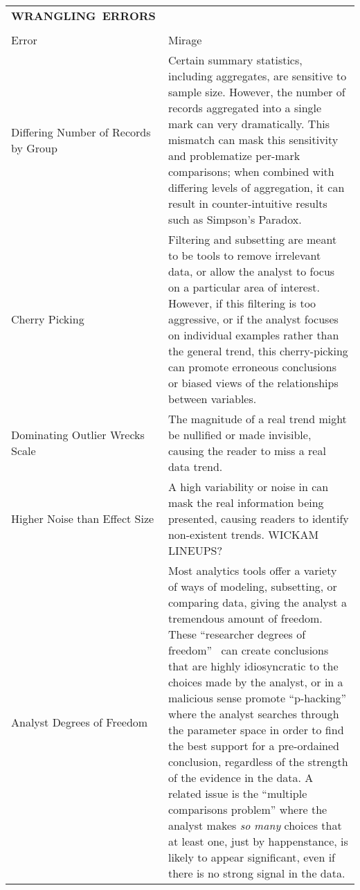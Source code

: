 \begin{longtable}{p{3cm}p{14cm}}
  \\\hbox{\normalsize{\textbf{WRANGLING ERRORS}}}&\\ \\
  \normalsize{Error} & \normalsize{Mirage}\\ \hline
   \rowcolor{colorb}Differing Number \newline of Records by \newline Group  & Certain summary statistics, including aggregates, are sensitive to sample size. However, the number of records aggregated into a single mark can very dramatically. This mismatch can mask this sensitivity and problematize per-mark comparisons; when combined with differing levels of aggregation, it can result in counter-intuitive results such as Simpson's Paradox. \cite{guo2017you}\\
 \rowcolor{colorb-opaque}Cherry Picking & Filtering and subsetting are meant to be tools to remove irrelevant data, or allow the analyst to focus on a particular area of interest. However, if this filtering is too aggressive, or if the analyst focuses on individual examples rather than the general trend, this cherry-picking can promote erroneous conclusions or biased views of the relationships between variables. \cite{few2019loom}\\
 \rowcolor{colorb}Dominating Outlier Wrecks Scale & The magnitude of a real trend might be nullified or made invisible, causing the reader to miss a real data trend.  \cite{kindlmann2014algebraic}\\
 \rowcolor{colorb-opaque}Higher Noise than Effect Size & A high variability or noise in can mask the real information being presented, causing readers to identify non-existent trends. WICKAM LINEUPS?\\
 \rowcolor{colorb}Analyst Degrees of Freedom & Most analytics tools offer a variety of ways of modeling, subsetting, or comparing data, giving the analyst a tremendous amount of freedom. These ``researcher degrees of freedom''~\cite{} can create conclusions that are highly idiosyncratic to the choices made by the analyst, or in a malicious sense promote ``p-hacking'' where the analyst searches through the parameter space in order to find the best support for a pre-ordained conclusion, regardless of the strength of the evidence in the data. A related issue is the ``multiple comparisons problem'' where the analyst makes \emph{so many} choices that at least one, just by happenstance, is likely to appear significant, even if there is no strong signal in the data. \cite{gelman2013garden,pu2018garden,zgraggen2018investigating}\\

\end{longtable}
